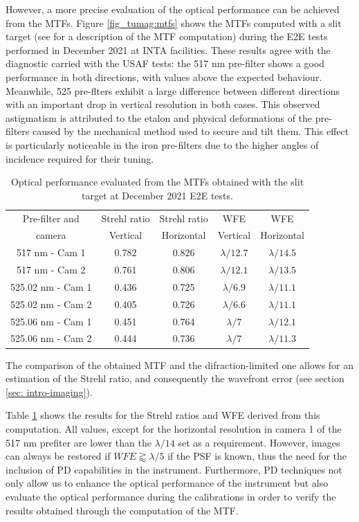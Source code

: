 However, a more precise evaluation of the optical performance can be achieved from the MTFs. Figure \ref{fig_tumag:mtfs} shows the MTFs computed with a slit target (see \cite{slanted-method} for a description of the MTF computation) during the E2E tests performed in December 2021 at INTA facilities. These results agree with the diagnostic carried with the USAF tests: the 517 nm pre-filter shows a good performance in both directions, with values above the expected behaviour. Meanwhile, 525 pre-flters exhibit a large difference between different directions with an important drop in vertical resolution in both cases. This observed astigmatism is attributed to the etalon and physical deformations of the pre-filters caused by the mechanical method used to secure and tilt them. This effect is particularly noticeable in the iron pre-filters due to the higher angles of incidence required for their tuning.

\begin{table}[t]
    \centering
   \begin{tabular}{ccccc}
    \hline
    \hline
    Pre-filter and & Strehl ratio & Strehl ratio & WFE& WFE\\
    camera & Vertical & Horizontal & Vertical & Horizontal\\
    \hline
    517 nm - Cam 1 & 0.782 & 0.826 & $\lambda/12.7$ & $\lambda/14.5$ \\
    517 nm - Cam 2 & 0.761 & 0.806 & $\lambda/12.1$ & $\lambda/13.5$ \\
    525.02 nm - Cam 1 & 0.436 & 0.725 & $\lambda/6.9$ & $\lambda/11.1$ \\
    525.02 nm - Cam 2 & 0.405 & 0.726 & $\lambda/6.6$ & $\lambda/11.1$ \\
    525.06 nm - Cam 1 & 0.451 & 0.764 & $\lambda/7$ & $\lambda/12.1$ \\
    525.06 nm - Cam 2 & 0.444 & 0.736 & $\lambda/7$ & $\lambda/11.3$ \\
    \hline
    \hline
    \end{tabular}
    \caption{Optical performance evaluated from the MTFs obtained with the slit target at December 2021 E2E tests.}
    \label{table: Optical-performance}
\end{table}


The comparison of the obtained MTF and the difraction-limited one allows for an estimation of the Strehl ratio, and consequently the wavefront error (see section \ref{sec: intro-imaging}).

Table \ref{table: Optical-performance} shows the results for the Strehl ratios and WFE derived from this computation. All values, except for the horizontal resolution in camera 1 of the 517 nm prefiter are lower than the $\lambda/14$ set as a requirement. However, images can always be restored if $WFE \gtrapprox \lambda / 5$ \citep{restoration-limit} if the PSF is known, thus the need for the inclusion of PD capabilities in the instrument. Furthermore, PD techniques not only allow us to enhance the optical performance of the instrument but also evaluate the optical performance during the calibrations in order to verify the results obtained through the computation of the MTF. 

